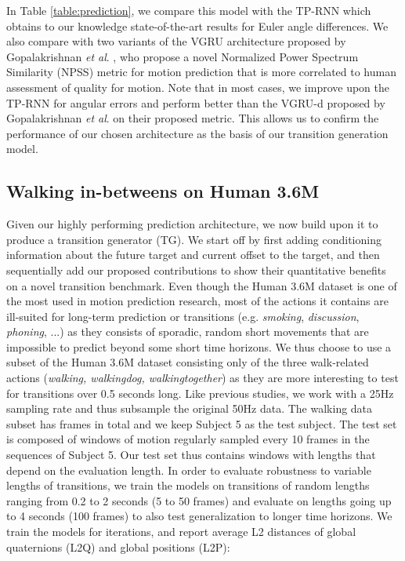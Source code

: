 \documentclass[acmtog]{acmart}
\newcommand{\etal}{\textit{et al}. }
\begin{document}
In Table \ref{table:prediction}, we compare this model with the TP-RNN which obtains to our knowledge state-of-the-art results for Euler angle differences. We also compare with two variants of the VGRU architecture proposed by Gopalakrishnan \etal {}, who propose a novel Normalized Power Spectrum Similarity (NPSS) metric for motion prediction that is more correlated to human assessment of quality for motion. Note that in most cases, we improve upon the TP-RNN for angular errors and perform better than the VGRU-d proposed by Gopalakrishnan \etal {} on their proposed metric. This allows us to confirm the performance of our chosen architecture as the basis of our transition generation model.  \subsection{Walking in-betweens on Human 3.6M}\label{sec:human_transition}
Given our highly performing prediction architecture, we now build upon it to produce a transition generator (TG). We start off by first adding conditioning information about the future target and current offset to the target, and then sequentially add our proposed contributions to show their quantitative benefits on a novel transition benchmark. Even though the Human 3.6M dataset is one of the most used in motion prediction research, most of the actions it contains are ill-suited for long-term prediction or transitions (e.g. \textit{smoking}, \textit{discussion}, \textit{phoning}, ...) as they consists of sporadic, random short movements that are impossible to predict beyond some short time horizons. We thus choose to use a subset of the Human 3.6M dataset consisting only of the three walk-related actions (\textit{walking, walkingdog, walkingtogether}) as they are more interesting to test for transitions over 0.5 seconds long. Like previous studies, we work with a 25Hz sampling rate and thus subsample the original 50Hz data. The walking data subset has  frames in total and we keep Subject 5 as the test subject. The test set is composed of windows of motion regularly sampled every 10 frames in the sequences of Subject 5. Our test set thus contains  windows with lengths that depend on the evaluation length. In order to evaluate robustness to variable lengths of transitions, we train the models on transitions of random lengths ranging from 0.2 to 2 seconds (5 to 50 frames) and evaluate on lengths going up to 4 seconds (100 frames) to also test generalization to longer time horizons. We train the models for  iterations, and report average L2 distances of global quaternions (L2Q) and global positions (L2P):
\end{document}
